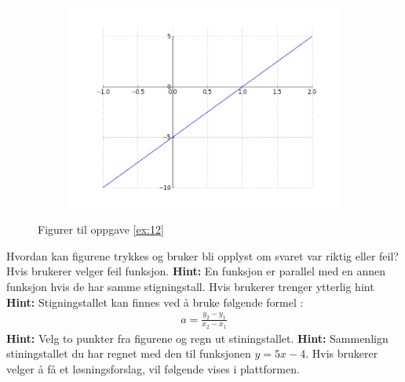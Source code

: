 \documentclass[12pt,twoside,onecolumn]{article}
\begin{document}
\begin{Exercise}
\begin{figure}[h!]
\begin{subfigure}{.5\textwidth}
    \end{subfigure}
    \begin{subfigure}{.5\textwidth}
    \centering
    \includegraphics[scale = 0.4]{figures/5xm5.png}
    \end{subfigure}
    \caption{Figurer til oppgave \ref{ex:12}}
\end{figure}
{\color{Cerulean} Hvordan kan figurene trykkes og bruker bli opplyst om svaret var riktig eller feil?}
\newline
\newline
{\color{Maroon} Hvis brukerer velger feil funksjon.}
\newline
\textbf{Hint:} En funksjon er parallel med en annen funksjon hvis de har samme stigningstall. 
\newline
\newline
{\color{Maroon} Hvis brukerer trenger ytterlig hint}
\newline
\textbf{Hint:} Stigningstallet kan finnes ved å bruke følgende formel :
\begin{align}
a = \frac{y_2 - y_1}{x_2 - x_1}
\end{align} 
\newline
\newline
\textbf{Hint:} Velg to punkter fra figurene og regn ut stiningstallet. 
\newline
\newline
\textbf{Hint:} Sammenlign stiningstallet du har regnet med den til funksjonen $y = 5x - 4$.
\newline
\newline
{\color{Maroon} Hvis brukerer velger å få et løsningsforslag, vil følgende vises i plattformen.}

\end{Exercise}
\end{document}
